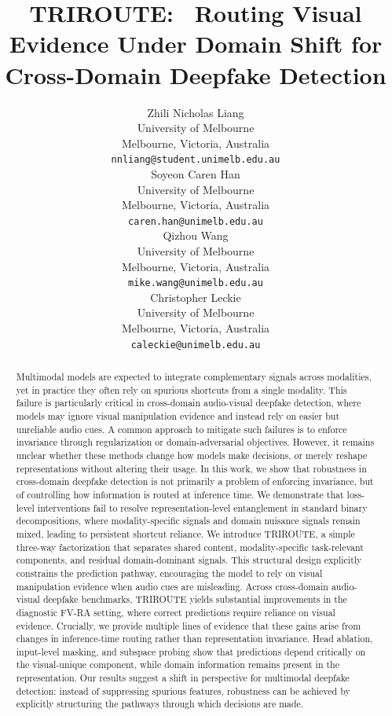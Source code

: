 \documentclass{article}
\title{TRIROUTE:  Routing Visual Evidence Under Domain Shift for Cross-Domain Deepfake Detection}
\author{%
  Zhili Nicholas Liang \\
  University of Melbourne \\
  Melbourne, Victoria, Australia \\
  \texttt{nnliang@student.unimelb.edu.au} \\
  \And
  Soyeon Caren Han \\
  University of Melbourne \\
  Melbourne, Victoria, Australia \\
  \texttt{caren.han@unimelb.edu.au} \\
  \And
  Qizhou Wang \\
  University of Melbourne \\
  Melbourne, Victoria, Australia \\
  \texttt{mike.wang@unimelb.edu.au} \\
  \And
  Christopher Leckie \\
  University of Melbourne \\
  Melbourne, Victoria, Australia \\
  \texttt{caleckie@unimelb.edu.au} \\
}
\begin{document}
\maketitle


\begin{abstract}
Multimodal models are expected to integrate complementary signals across modalities, yet in practice they often rely on spurious shortcuts from a single modality. This failure is particularly critical in cross-domain audio-visual deepfake detection, where models may ignore visual manipulation evidence and instead rely on easier but unreliable audio cues. A common approach to mitigate such failures is to enforce invariance through regularization or domain-adversarial objectives. However, it remains unclear whether these methods change how models make decisions, or merely reshape representations without altering their usage.
In this work, we show that robustness in cross-domain deepfake detection is not primarily a problem of enforcing invariance, but of controlling how information is routed at inference time. We demonstrate that loss-level interventions fail to resolve representation-level entanglement in standard binary decompositions, where modality-specific signals and domain nuisance signals remain mixed, leading to persistent shortcut reliance.
We introduce TRIROUTE, a simple three-way factorization that separates shared content, modality-specific task-relevant components, and residual domain-dominant signals. This structural design explicitly constrains the prediction pathway, encouraging the model to rely on visual manipulation evidence when audio cues are misleading.
Across cross-domain audio-visual deepfake benchmarks, TRIROUTE yields substantial improvements in the diagnostic FV-RA setting, where correct predictions require reliance on visual evidence. Crucially, we provide multiple lines of evidence that these gains arise from changes in inference-time routing rather than representation invariance. Head ablation, input-level masking, and subspace probing show that predictions depend critically on the visual-unique component, while domain information remains present in the representation.
Our results suggest a shift in perspective for multimodal deepfake detection: instead of suppressing spurious features, robustness can be achieved by explicitly structuring the pathways through which decisions are made.
\end{abstract}
\end{document}
